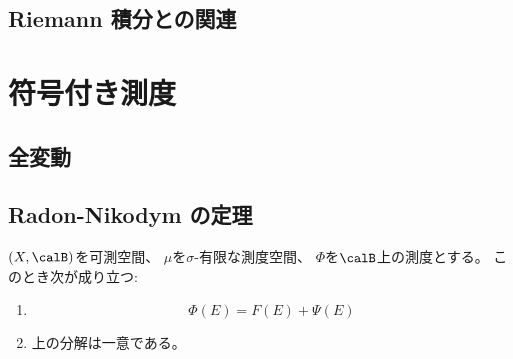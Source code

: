 \documentclass[report]{jlreq}
\begin{document}
\begin{definition}
    \TODO{}
\end{definition}

%
\section{Riemann 積分との関連}




%
\chapter{符号付き測度}

%
\section{全変動}


\begin{definition}[全変動]
    \TODO{}
\end{definition}

%
\section{Radon-Nikodym の定理}

\begin{definition}[絶対連続と特異]
    \TODO{}
\end{definition}

\begin{proposition}[Lebesgue 分解]
    $(X, \calB)$を可測空間、
    $\mu$を$\sigma$-有限な測度空間、
    $\Phi$を$\calB$上の測度とする。
    このとき次が成り立つ:
    \begin{enumerate}
        \item \TODO{}
            \begin{equation}
                \Phi(E) = F(E) + \Psi(E)
            \end{equation}
        \item 上の分解は一意である。
    \end{enumerate}
\end{proposition}
\end{document}
